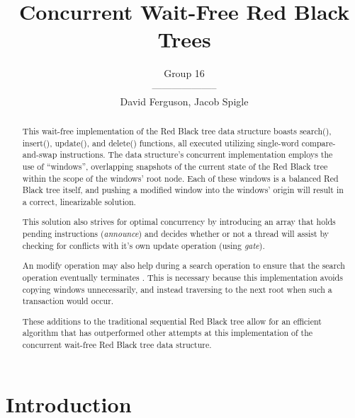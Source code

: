 \documentclass[12pt,a4paper]{article}
\author{Group 16 \\ -------------------- \\David Ferguson, Jacob Spigle}
\title{Concurrent Wait-Free Red Black Trees}
\begin{document}
	
\maketitle
\begin{abstract}
	This wait-free implementation of the Red Black tree data structure boasts search(), insert(), update(), and delete() functions, all executed utilizing single-word compare-and-swap instructions. The data structure's concurrent implementation employs the use of ``windows'', overlapping snapshots of the current state of the Red Black tree within the scope of the windows' root node. Each of these windows is a balanced Red Black tree itself, and pushing a modified window into the windows' origin will result in a correct, linearizable solution. \par This solution also strives for optimal concurrency by introducing an array that holds pending instructions (\textit{announce}) and decides whether or not a thread will assist by checking for conflicts with it's own update operation (using \textit{gate}). \par An modify operation may also help during a search operation to ensure that the search operation eventually terminates \cite{RedBlackDoc}. This is necessary because this implementation avoids copying windows unnecessarily, and instead traversing to the next root when such a transaction would occur. \par These additions to the traditional sequential Red Black tree allow for an efficient algorithm that has outperformed other attempts at this implementation of the concurrent wait-free Red Black tree data structure.
\end{abstract}
\newpage
{}
\section{Introduction}



\newpage
{}


\end{document}
